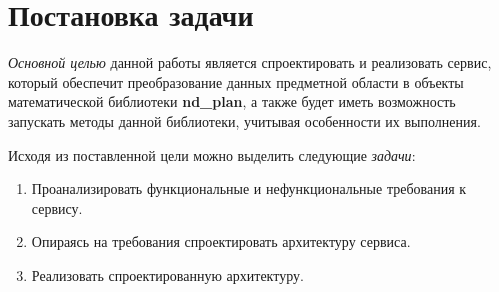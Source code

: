 \section*{\Large{Постановка задачи}}

\textit{Основной целью} данной работы является спроектировать и реализовать сервис, который обеспечит
преобразование данных предметной области в объекты математической библиотеки \textbf{nd\_plan},
а также будет иметь возможность запускать методы данной библиотеки, учитывая особенности их выполнения.

Исходя из поставленной цели можно выделить следующие \textit{задачи}:
\begin{enumerate}
    \item Проанализировать функциональные и нефункциональные требования к сервису.
    \item Опираясь на требования спроектировать архитектуру сервиса.
    \item Реализовать спроектированную архитектуру.
\end{enumerate}

